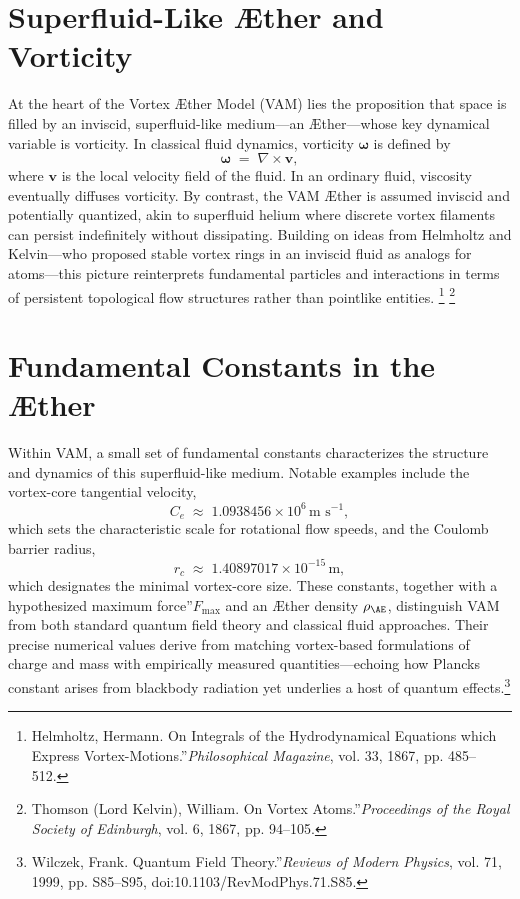 
\section{Superfluid-Like Æther and Vorticity}

At the heart of the Vortex Æther Model (VAM) lies the proposition that space is filled by an inviscid, superfluid-like medium—an Æther—whose key dynamical variable is vorticity. In classical fluid dynamics, vorticity \(\boldsymbol{\omega}\) is defined by
\[
    \boldsymbol{\omega} \;=\; \nabla \times \mathbf{v},
\]
where \(\mathbf{v}\) is the local velocity field of the fluid. In an ordinary fluid, viscosity eventually diffuses vorticity. By contrast, the VAM Æther is assumed inviscid and potentially quantized, akin to superfluid helium where discrete vortex filaments can persist indefinitely without dissipating. Building on ideas from Helmholtz and Kelvin—who proposed stable vortex rings in an inviscid fluid as analogs for atoms—this picture reinterprets fundamental particles and interactions in terms of persistent topological flow structures rather than pointlike entities.
\footnote{Helmholtz, Hermann. \grqq On Integrals of the Hydrodynamical Equations which Express Vortex-Motions.\textquotedblright \textit{Philosophical Magazine}, vol. 33, 1867, pp. 485–512.}
\footnote{Thomson (Lord Kelvin), William. \grqq On Vortex Atoms.\textquotedblright \textit{Proceedings of the Royal Society of Edinburgh}, vol. 6, 1867, pp. 94–105.}

\section{Fundamental Constants in the Æther}

Within VAM, a small set of fundamental constants characterizes the structure and dynamics of this superfluid-like medium. Notable examples include the vortex-core tangential velocity,
\[
    C_{e} \;\approx\; 1.0938456 \times 10^{6} \, \text{m s}^{-1},
\]
which sets the characteristic scale for rotational flow speeds, and the Coulomb barrier radius,
\[
    r_{c} \;\approx\; 1.40897017 \times 10^{-15} \, \text{m},
\]
which designates the minimal vortex-core size. These constants, together with a hypothesized \grqq maximum force\textquotedblright \(F_{\max}\) and an Æther density \(\rho_{\mathrm{\AE}}\), distinguish VAM from both standard quantum field theory and classical fluid approaches. Their precise numerical values derive from matching vortex-based formulations of charge and mass with empirically measured quantities—echoing how Planck\rqs s constant arises from blackbody radiation yet underlies a host of quantum effects.\footnote{Wilczek, Frank. \grqq Quantum Field Theory.\textquotedblright \textit{Reviews of Modern Physics}, vol. 71, 1999, pp. S85–S95, doi:10.1103/RevModPhys.71.S85.}

